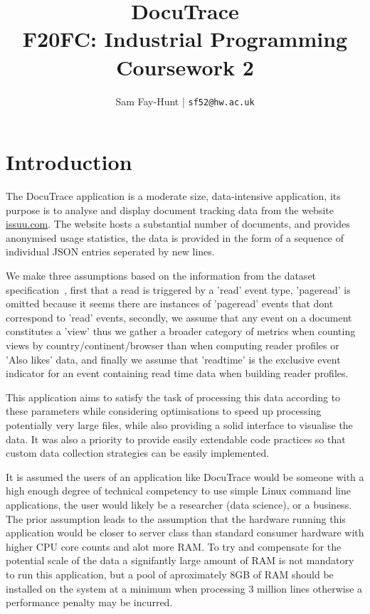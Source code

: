 \documentclass[11pt]{article}
\begin{document}
\title{%
	\bf DocuTrace\\ 
    \large F20FC: Industrial Programming\\
    Coursework 2}

\author{
	Sam Fay-Hunt | \texttt{sf52@hw.ac.uk}
}

\maketitle
\thispagestyle{empty}
\pagebreak


\tableofcontents
\thispagestyle{empty}
\pagebreak


\setcounter{page}{1}

\section{Introduction}
The DocuTrace application is a moderate size, data-intensive application, its purpose is to analyse and display document tracking data from the website \href{https://issuu.com/}{issuu.com}. 
The website hosts a substantial number of documents, and provides anonymised usage statistics, the data is provided in the form of a sequence of individual JSON entries seperated by new lines.

We make three assumptions based on the information from the dataset specification~\autocite{IssuuAnonymousDataset}, first that a read is triggered by a 'read' event type, 'pageread' is omitted because it seems there are instances of 'pageread' events that dont correspond to 'read' events, secondly, we assume that any event on a document constitutes a 'view' thus we gather a broader category of metrics when counting views by country/continent/browser than when computing reader profiles or 'Also likes' data, and finally we assume that 'readtime' is the exclusive event indicator for an event containing read time data when building reader profiles.

This application aims to satisfy the task of processing this data according to these parameters while considering optimisations to speed up processing potentially very large files, while also providing a solid interface to visualise the data.
It was also a priority to provide easily extendable code practices so that custom data collection strategies can be easily implemented.

It is assumed the users of an application like DocuTrace would be someone with a high enough degree of technical competency to use simple Linux command line applications, the user would likely be a researcher (data science), or a business. 
The prior assumption leads to the assumption that the hardware running this application would be closer to server class than standard consumer hardware with higher CPU core counts and alot more RAM.
To try and compensate for the potential scale of the data a signifantly large amount of RAM is not mandatory to run this application, but a pool of aproximately 8GB of RAM should be installed on the system at a minimum when processing 3 million lines otherwise a performance penalty may be incurred.
\end{document}
